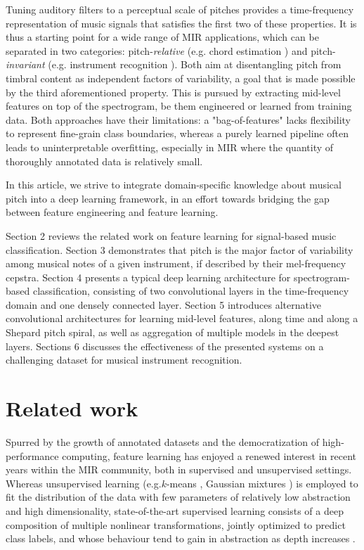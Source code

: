 \documentclass{article}
\makeatletter
\newcommand*{\eg}{e.g.\@\xspace}
\makeatother
\begin{document}
Tuning auditory filters to a perceptual scale of pitches provides a
time-frequency representation of music signals that satisfies the first two of these properties.
It is thus a starting point for a wide range of MIR applications,
which can be separated in two categories: pitch-\emph{relative}
(\eg chord estimation \cite{Humphrey2012tonnetz})
and pitch-\emph{invariant} (\eg instrument recognition \cite{Eronen2000}).
Both aim at disentangling pitch from timbral content as independent
factors of variability, a goal that is made possible by the third aforementioned property.
This is pursued by extracting mid-level features on top of the spectrogram,
be them engineered or learned from training data.
Both approaches have their limitations: a "bag-of-features" lacks flexibility
to represent fine-grain class boundaries, whereas a purely learned pipeline
often leads to uninterpretable overfitting, especially in MIR where the quantity
of thoroughly annotated data is relatively small.

In this article, we strive to integrate domain-specific knowledge about musical
pitch into a deep learning framework, in an effort towards bridging the gap
between feature engineering and feature learning.

Section 2 reviews the related work on feature learning for signal-based music
classification.
Section 3 demonstrates that pitch is the major factor of variability among musical
notes of a given instrument, if described by their mel-frequency cepstra.
Section 4 presents a typical deep learning architecture for spectrogram-based
classification, consisting of two convolutional layers in the time-frequency
domain and one densely connected layer.
Section 5 introduces alternative convolutional architectures for learning
mid-level features, along time and along a Shepard pitch spiral, as well as
aggregation of multiple models in the deepest layers.
Sections 6 discusses the effectiveness of the presented systems on a challenging
dataset for musical instrument recognition.

\section{Related work}
Spurred by the growth of annotated datasets and the democratization of
high-performance computing, feature learning has enjoyed a renewed interest
in recent years within the MIR community, both in supervised and unsupervised
settings.
Whereas unsupervised learning (\eg $k$-means \cite{Stowell2014}, Gaussian
mixtures \cite{Joder2009}) is employed to fit the distribution of the data with
few parameters of relatively low abstraction
and high dimensionality, state-of-the-art supervised learning consists of a deep
composition of multiple nonlinear transformations, jointly optimized
to predict class labels, and whose behaviour tend to gain in abstraction as depth
increases \cite{vandenOord2013}.
\end{document}
